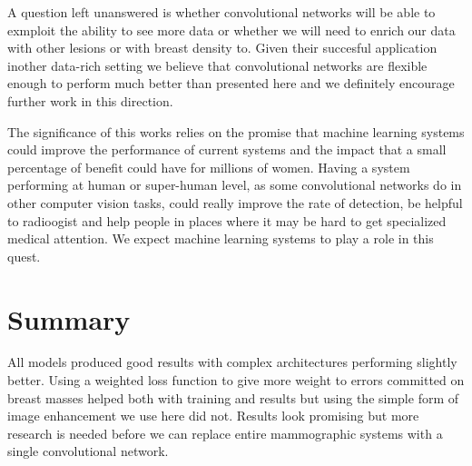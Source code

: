 A question left unanswered is whether convolutional networks will be able to exmploit the ability to see more data or whether we will need to enrich our data with other lesions or with breast density to. Given their succesful application inother data-rich setting we believe that convolutional networks are flexible enough to perform much better than presented here and we definitely encourage further work in this direction.

The significance of this works relies on the promise that machine learning systems could improve the performance of current systems and the impact that a small percentage of benefit could have for millions of women. Having a system performing at human or super-human level, as some convolutional networks do in other computer vision tasks, could really improve the rate of detection, be helpful to radioogist and help people in places where it may be hard to get specialized medical attention. We expect machine learning systems to play a role in this quest.

\section{Summary}
All models produced good results with complex architectures performing slightly better. Using a weighted loss function to give more weight to errors committed on breast masses helped both with training and results but using the simple form of image enhancement we use here did not. Results look promising but more research is needed before we can replace entire mammographic systems with a single convolutional network.
